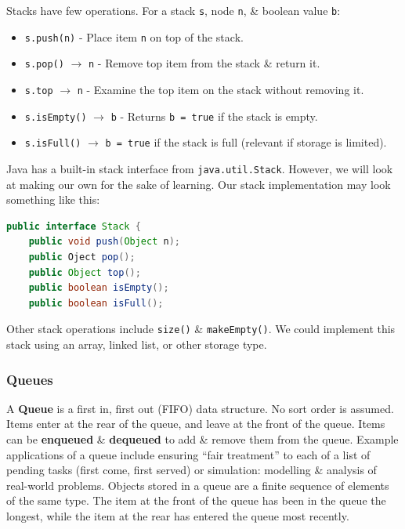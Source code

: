 \documentclass[11pt]{article}
\begin{document}
Stacks have few operations. 
For a stack \verb|s|, node \verb|n|, \& boolean value \verb|b|:
\begin{itemize}
    \item \verb|s.push(n)| - Place item \verb|n| on top of the stack. 
    \item \verb|s.pop()| $\rightarrow$ \verb|n| - Remove top item from the stack \& return it. 
    \item \verb|s.top| $\rightarrow$ \verb|n| - Examine the top item on the stack without removing it. 
    \item \verb|s.isEmpty()| $\rightarrow$ \verb|b| - Returns \verb|b = true| if the stack is empty. 
    \item \verb|s.isFull()| $\rightarrow$ \verb|b = true| if the stack is full (relevant if storage is limited). 
\end{itemize}

Java has a built-in stack interface from \verb|java.util.Stack|. 
However, we will look at making our own for the sake of learning. 
Our stack implementation may look something like this:
\begin{lstlisting}[language=java]
public interface Stack {
    public void push(Object n);
    public Oject pop();
    public Object top();
    public boolean isEmpty();
    public boolean isFull();
\end{lstlisting}

Other stack operations include \verb|size()| \& \verb|makeEmpty()|. 
We could implement this stack using an array, linked list, or other storage type. 

\subsubsection{Queues}
A \textbf{Queue} is a first in, first out (FIFO) data structure. 
No sort order is assumed.
Items enter at the rear of the queue, and leave at the front of the queue. 
Items can be \textbf{enqueued} \& \textbf{dequeued} to add \& remove them from the queue. 
Example applications of a queue include ensuring ``fair treatment'' to each of a list of pending tasks (first come, first served) 
or simulation: modelling \& analysis of real-world problems.
Objects stored in a queue are a finite sequence of elements of the same type. 
The item at the front of the queue has been in the queue the longest, while the item at the rear has entered the queue most recently. 
\end{document}
